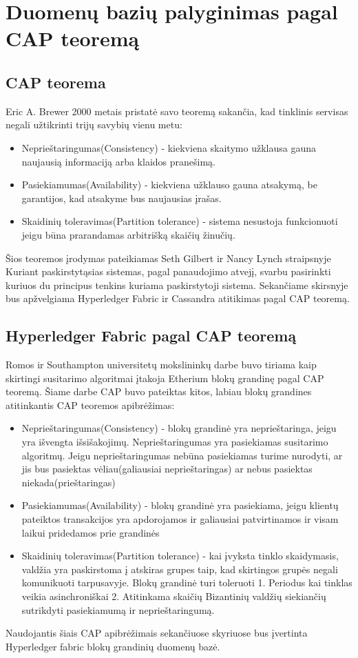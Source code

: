 \documentclass{VUMIFPSkursinis}
\begin{document}
\section{Duomenų bazių palyginimas pagal CAP teoremą}
\subsection{CAP teorema}
Eric A. Brewer 2000 \cite{CAP} metais pristatė savo teoremą sakančia, kad tinklinis servisas negali užtikrinti trijų savybių vienu metu:
\begin{itemize}
\item{Neprieštaringumas(Consistency) - kiekviena skaitymo užklausa gauna naujausią informaciją arba klaidos pranešimą.}
\item{Pasiekiamumas(Availability) - kiekviena užklauso gauna atsakymą, be garantijos, kad atsakyme bus naujausias įrašas. }
\item{Skaidinių toleravimas(Partition tolerance) - sistema nesustoja funkcionuoti jeigu būna prarandamas arbitrišką skaičių žinučių.}
\end{itemize}
Šios teoremos įrodymas pateikiamas Seth Gilbert ir Nancy Lynch straipsnyje \cite{CAPP}
\linebreak
Kuriant paskirstytąsias sistemas, pagal panaudojimo atvejį, svarbu pasirinkti kuriuos du principus tenkins kuriama paskirstytoji sistema.
Sekančiame skirsnyje bus apžvelgiama Hyperledger Fabric ir Cassandra atitikimas pagal CAP teoremą.
\subsection{Hyperledger Fabric pagal CAP teoremą}
Romos ir Southampton universitetų mokslininkų darbe \cite{BCCAP} buvo tiriama kaip skirtingi susitarimo algoritmai įtakoja Etherium blokų grandinę
pagal CAP teoremą. Šiame darbe CAP buvo pateiktas kitos, labiau blokų grandines atitinkantis CAP teoremos apibrėžimas:
\begin{itemize}
\item{Neprieštaringumas(Consistency) - blokų grandinė yra neprieštaringa, jeigu yra išvengta išsišakojimų. Neprieštaringumas yra pasiekiamas 
susitarimo algoritmų. Jeigu neprieštaringumas nebūna pasiekiamas turime nurodyti, ar jis bus pasiektas vėliau(galiausiai neprieštaringas) ar nebus pasiektas niekada(prieštaringas) }
\item{Pasiekiamumas(Availability) - blokų grandinė yra pasiekiama, jeigu klientų pateiktos transakcijos yra apdorojamos ir galiausiai patvirtinamos ir visam laikui pridedamos prie grandinės}
\item{Skaidinių toleravimas(Partition tolerance) - kai įvyksta tinklo skaidymasis, valdžia yra paskirstoma į atskiras grupes taip, kad skirtingos grupės negali komunikuoti tarpusavyje. Blokų grandinė turi toleruoti 1. Periodus kai tinklas veikia asinchroniškai 2. Atitinkama skaičių Bizantinių valdžių siekiančių sutrikdyti pasiekiamumą ir neprieštaringumą.}
\end{itemize}
Naudojantis šiais CAP apibrėžimais sekančiuose skyriuose bus įvertinta Hyperledger fabric blokų grandinių duomenų bazė.
\end{document}
